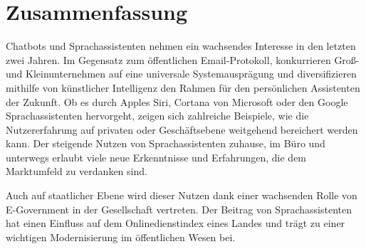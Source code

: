 


\newpage
\chapter*{Zusammenfassung}

Chatbots und Sprachassistenten nehmen ein wachsendes Interesse in den letzten zwei Jahren. %
Im Gegensatz zum öffentlichen Email-Protokoll, 
konkurrieren Groß- und Kleinunternehmen auf eine universale Systemausprägung und diversifizieren mithilfe von künstlicher Intelligenz den Rahmen für den persönlichen Assistenten der Zukunft.
Ob es durch Apples Siri, Cortana von Microsoft oder den Google Sprachassistenten hervorgeht, zeigen sich zahlreiche Beispiele, wie die Nutzererfahrung auf privaten oder Geschäftsebene weitgehend bereichert werden kann.
Der steigende Nutzen von Sprachassistenten zuhause, im Büro und unterwegs erlaubt viele neue Erkenntnisse und Erfahrungen, die dem Marktumfeld zu verdanken sind. 


 
Auch auf staatlicher Ebene wird dieser Nutzen dank einer wachsenden Rolle von E-Government in der Gesellschaft vertreten. %
Der Beitrag von Sprachassistenten hat einen Einfluss auf dem Onlinedienstindex eines Landes und trägt zu einer wichtigen Modernisierung im öffentlichen Wesen bei.

